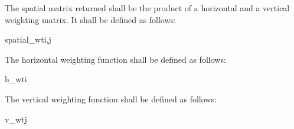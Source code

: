 The spatial matrix returned shall be the product of a horizontal and a vertical
weighting matrix. It shall be defined as follows:

\begin{pseudo}{spatial\_wt}{i,j}
    \bsEND
\bsEND
{}
\end{pseudo}

The horizontal weighting function shall be defined as follows:

\begin{pseudo}{h\_wt}{i}
\bsEND
{}
\bsEND
{}
    \bsEND
{}
    \bsEND
\bsEND
{}
\end{pseudo}

The vertical weighting function  shall be defined as follows:

\begin{pseudo}{v\_wt}{j}
\bsEND
{}
\bsEND
{}
    \bsEND
{}
    \bsEND
\bsEND
{}
\end{pseudo}

